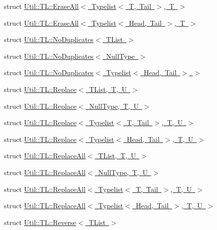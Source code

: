 \begin{DoxyCompactItemize}
struct \mbox{\hyperlink{structUtil_1_1TL_1_1EraseAll_3_01Typelist_3_01T_00_01Tail_01_4_00_01T_01_4}{Util\+::\+T\+L\+::\+Erase\+All$<$ Typelist$<$ T, Tail $>$, T $>$}}
\item 
struct \mbox{\hyperlink{structUtil_1_1TL_1_1EraseAll_3_01Typelist_3_01Head_00_01Tail_01_4_00_01T_01_4}{Util\+::\+T\+L\+::\+Erase\+All$<$ Typelist$<$ Head, Tail $>$, T $>$}}
\item 
struct \mbox{\hyperlink{structUtil_1_1TL_1_1NoDuplicates}{Util\+::\+T\+L\+::\+No\+Duplicates$<$ T\+List $>$}}
\item 
struct \mbox{\hyperlink{structUtil_1_1TL_1_1NoDuplicates_3_01NullType_01_4}{Util\+::\+T\+L\+::\+No\+Duplicates$<$ Null\+Type $>$}}
\item 
struct \mbox{\hyperlink{structUtil_1_1TL_1_1NoDuplicates_3_01Typelist_3_01Head_00_01Tail_01_4_01_4}{Util\+::\+T\+L\+::\+No\+Duplicates$<$ Typelist$<$ Head, Tail $>$ $>$}}
\item 
struct \mbox{\hyperlink{structUtil_1_1TL_1_1Replace}{Util\+::\+T\+L\+::\+Replace$<$ T\+List, T, U $>$}}
\item 
struct \mbox{\hyperlink{structUtil_1_1TL_1_1Replace_3_01NullType_00_01T_00_01U_01_4}{Util\+::\+T\+L\+::\+Replace$<$ Null\+Type, T, U $>$}}
\item 
struct \mbox{\hyperlink{structUtil_1_1TL_1_1Replace_3_01Typelist_3_01T_00_01Tail_01_4_00_01T_00_01U_01_4}{Util\+::\+T\+L\+::\+Replace$<$ Typelist$<$ T, Tail $>$, T, U $>$}}
\item 
struct \mbox{\hyperlink{structUtil_1_1TL_1_1Replace_3_01Typelist_3_01Head_00_01Tail_01_4_00_01T_00_01U_01_4}{Util\+::\+T\+L\+::\+Replace$<$ Typelist$<$ Head, Tail $>$, T, U $>$}}
\item 
struct \mbox{\hyperlink{structUtil_1_1TL_1_1ReplaceAll}{Util\+::\+T\+L\+::\+Replace\+All$<$ T\+List, T, U $>$}}
\item 
struct \mbox{\hyperlink{structUtil_1_1TL_1_1ReplaceAll_3_01NullType_00_01T_00_01U_01_4}{Util\+::\+T\+L\+::\+Replace\+All$<$ Null\+Type, T, U $>$}}
\item 
struct \mbox{\hyperlink{structUtil_1_1TL_1_1ReplaceAll_3_01Typelist_3_01T_00_01Tail_01_4_00_01T_00_01U_01_4}{Util\+::\+T\+L\+::\+Replace\+All$<$ Typelist$<$ T, Tail $>$, T, U $>$}}
\item 
struct \mbox{\hyperlink{structUtil_1_1TL_1_1ReplaceAll_3_01Typelist_3_01Head_00_01Tail_01_4_00_01T_00_01U_01_4}{Util\+::\+T\+L\+::\+Replace\+All$<$ Typelist$<$ Head, Tail $>$, T, U $>$}}
\item 
struct \mbox{\hyperlink{structUtil_1_1TL_1_1Reverse}{Util\+::\+T\+L\+::\+Reverse$<$ T\+List $>$}}

\end{DoxyCompactItemize}
